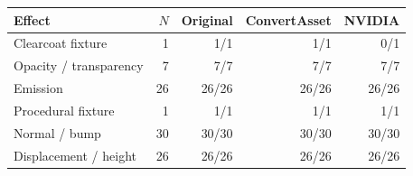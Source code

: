 \begin{tabular}{lrrrr}
\toprule
Effect & $N$ & Original & ConvertAsset & NVIDIA \\
\midrule
Clearcoat fixture & 1 & 1/1 & 1/1 & 0/1 \\
Opacity / transparency & 7 & 7/7 & 7/7 & 7/7 \\
Emission & 26 & 26/26 & 26/26 & 26/26 \\
Procedural fixture & 1 & 1/1 & 1/1 & 1/1 \\
Normal / bump & 30 & 30/30 & 30/30 & 30/30 \\
Displacement / height & 26 & 26/26 & 26/26 & 26/26 \\
\bottomrule
\end{tabular}
